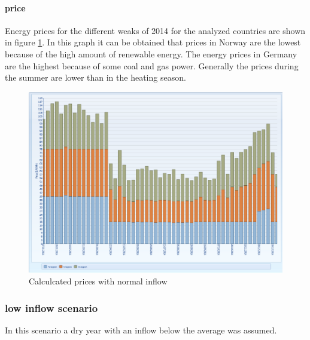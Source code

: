 \documentclass{article}
\begin{document}
\paragraph{price\\}
Energy prices for the different weaks of 2014 for the analyzed countries are shown in figure \ref{fig:MTpricesnormal}. In this graph it can be obtained that prices in Norway are the lowest because of the high amount of renewable energy. The energy prices in Germany are the highest because of some coal and gas power. Generally the prices during the summer are lower than in the heating season. 
\begin{figure}[htbp]
\begin{center}
\includegraphics[width=13cm,keepaspectratio=true]{figures/MTprices}
\caption{Calculcated prices with normal inflow}
\label{fig:MTpricesnormal}
\end{center}
\end{figure}

\subsubsection{low inflow scenario}
In this scenario a dry year with an inflow below the average was assumed. 
\end{document}
